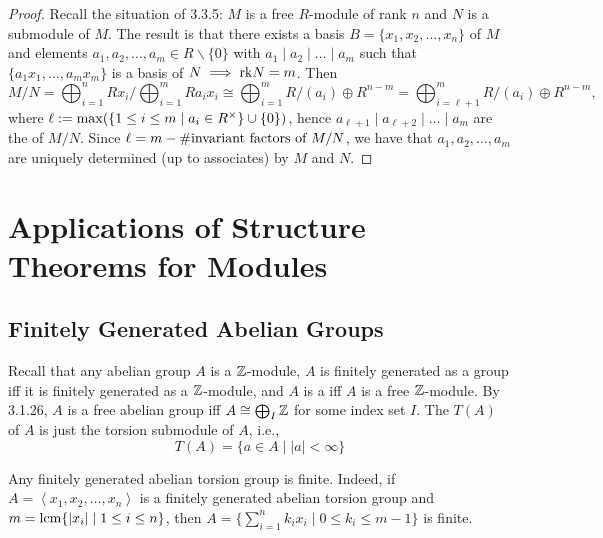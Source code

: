 \documentclass[11pt]{book}
\theoremstyle{definition}   \newtheorem{defn}[counter]{Definition} %
\newcommand{\bs}{\backslash}   \newcommand{\A}{\mathcal{A}}   \newcommand{\sy}{\textnormal{Syl}}   \newcommand{\size}[1]{\left| #1 \right|}
\newcommand{\gen}[1]{\left\langle #1 \right\rangle}   \newcommand{\stab}[2]{\tn{Stab}_{#1}(#2)}   \newcommand{\fix}[2]{\tn{Fix}_{#1}(#2)}   \newcommand{\op}{^{\tn{op}}}
\newcommand{\vs}{\vspace{8pt}}
\numberwithin{counter}{chapter}
\begin{document}
\begin{proof}
Recall the situation of 3.3.5: $M$ is a free $R$-module of rank $n$ and $N$ is a submodule of $M$. The result is that there exists a basis $B = \{x_1,x_2,\dots,x_n\}$ of $M$ and elements $a_1,a_2,\dots,a_m \in R\bs\{0\}$ with $a_1 \mid a_2 \mid \dots \mid a_m$ such that $\{a_1x_1,\dots,a_mx_m\}$ is a basis of $N \implies \textnormal{rk} N = m$. Then
	\[M/N = \bigoplus_{i=1}^n R x_i/\bigoplus_{i=1}^m R a_i x_i \cong \bigoplus_{i=1}^m R/(a_i) \oplus R^{n-m} = \bigoplus_{i=\ell+1}^m R/(a_i) \oplus R^{n-m}, \]
where $\ell := \max(\{1 \leq i \leq m \mid a_i \in R^{\times}\} \cup \{0\})$, hence $a_{\ell+1} \mid a_{\ell+2} \mid \dots \mid a_m$ are the  of $M/N$. Since $\ell = m - \#\textnormal{invariant factors of } M/N$, we have that $a_1,a_2,\dots,a_m$ are uniquely determined (up to associates) by $M$ and $N$.
\end{proof}





\chapter{Applications of Structure Theorems for Modules}



\section*{Finitely Generated Abelian Groups}

Recall that any abelian group $A$ is a $\operatorname{\mathbb{Z}}$-module, $A$ is finitely generated as a group iff it is finitely generated as a $\operatorname{\mathbb{Z}}$-module, and $A$ is a  iff $A$ is a free $\operatorname{\mathbb{Z}}$-module. By 3.1.26, $A$ is a free abelian group iff $A \cong \bigoplus_{I} \operatorname{\mathbb{Z}}$ for some index set $I$. The  $T(A)$ of $A$ is just the torsion submodule of $A$, i.e.,
	\[T(A) = \{a \in A \mid |a| < \infty\} \]

\begin{remark}
Any finitely generated abelian torsion group is finite. Indeed, if $A = \gen{x_1,x_2,\dots,x_n}$ is a finitely generated abelian torsion group and $m = \operatorname{\textrm{lcm}}\{|x_i| \mid 1 \leq i \leq n\}$, then $A = \{\sum_{i=1}^n k_i x_i \mid 0 \leq k_i \leq m-1\}$ is finite.
\end{remark}

\vs
\end{document}

